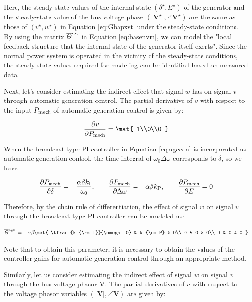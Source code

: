 \documentclass[graybox, envcountchap]{svmult}
\begin{document}
Here, the steady-state values of the internal state $(\delta^{\star},E^{\star})$
of the generator and the steady-state value of the bus voltage phase
$(|\bm{V}^{\star}|,\angle \bm{V}^{\star})$ are the same as those of
$(v^{\star},w^{\star})$ in Equation \ref{eq:Gbapxst} under the steady-state
conditions. By using the matrix $\overline{\mathit{\Theta}}^{\rm int}$ in
Equation \ref{eq:basenvm}, we can model the "local feedback structure that the
internal state of the generator itself exerts". Since the normal power system
is operated in the vicinity of the steady-state conditions, the steady-state
values required for modeling can be identified based on measured data.

Next, let's consider estimating the indirect effect that signal $w$ has on
signal $v$ through automatic generation control. The partial derivative of $v$
with respect to the input $P_{\rm mech}$ of automatic generation control is
given by:

\[
  \frac{\partial v}{\partial P_{\rm mech}}
  =
  \mat{
  1\\0\\0
}
\]

When the broadcast-type PI controller in Equation \ref{eq:agccon} is
incorporated as automatic generation control, the time integral of $\omega_0
\Delta \omega$ corresponds to $\delta$, so we have:

\[
  \frac{\partial P_{\rm mech}}{\partial \delta} = -  \frac{\alpha \beta k_{\rm I}}{\omega_0} 
  ,\qquad
  \frac{\partial P_{\rm mech}}{\partial \Delta \omega}= - \alpha \beta k_{\rm P}
  ,\qquad
  \frac{\partial P_{\rm mech}}{\partial E}= 0
\]

Therefore, by the chain rule of differentiation, the effect of signal $w$ on
signal $v$ through the broadcast-type PI controller can be modeled as:

\begin{equation}
  \overline{\mathit{\Theta}}^{\rm agc}:=
  -  \alpha \beta \mat{
  \tfrac{k_{\rm I}}{\omega_0} & k_{\rm P}  & 0\\
  0 & 0 & 0\\
  0 & 0 & 0
  }
\end{equation}

Note that to obtain this parameter, it is necessary to obtain the values of the
controller gains for automatic generation control through an appropriate method.

Similarly, let us consider estimating the indirect effect of signal $w$ on
signal $v$ through the bus voltage phasor $\bm{V}$.  The partial derivatives of
$v$ with respect to the voltage phasor variables $(|\bm{V}|,\angle \bm{V})$ are
given by:
\end{document}
